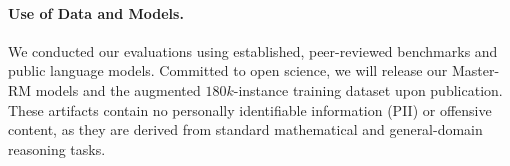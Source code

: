 \documentclass{article} %
\theoremstyle{plain}
\theoremstyle{definition}
\theoremstyle{remark}
\begin{document}
\paragraph{Use of Data and Models.} We conducted our evaluations using established, peer-reviewed benchmarks and public language models. Committed to open science, we will release our Master-RM models and the augmented $180k$-instance training dataset upon publication. These artifacts contain no personally identifiable information (PII) or offensive content, as they are derived from standard mathematical and general-domain reasoning tasks.




\newpage
\appendix


\end{document}
